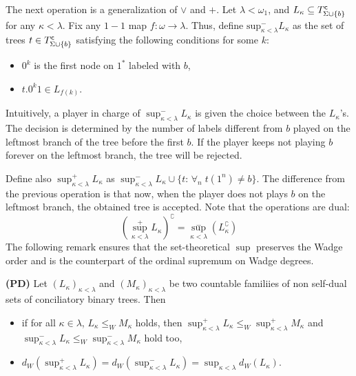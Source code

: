 \documentclass{llncs}
\begin{document}
The next operation is a generalization of $\lor$ and $+$. Let $\lambda < \omega_1$, and $L_\kappa \subseteq T^{\sf c}_{\Sigma \cup \{b\}}$
for any $\kappa<\lambda$. Fix any $1-1$ map $f: \omega \to \lambda$. Thus, define $\mathrm{sup}^-_{\kappa<\lambda} L_\kappa$ as the set of trees $t
\in  T^{\sf c}_{\Sigma \cup \{b\}}$ satisfying the following conditions for some $k$:
\begin{itemize}
\item $0^k$ is the first node on $1^*$ labeled with $b$,
\item $t.0^k1 \in L_{f(k)}$.
\end{itemize}
Intuitively, a player in charge of $\sup^-_{\kappa<\lambda} L_\kappa$ is given the choice
between the $L_\kappa$'s. The decision is determined by the number of labels different from $b$ played on
the leftmost branch of the tree before the first $b$. If the player keeps not
playing $b$  forever on the leftmost branch, the tree will be rejected.  

Define also
$\sup^+ _{\kappa<\lambda} L_\kappa$ as $\sup^-_{\kappa<\lambda} L_\kappa\cup \{t :\, \forall_n\; t(1^n)\neq b\}$.
The difference from the previous operation is that now, when the
player does not plays $b$ on the leftmost branch, the obtained tree is
accepted. Note that the operations are dual: 
\[\left ( \sup^+ _{\kappa<\lambda} L_\kappa \right )^\complement = \sup^-_{\kappa<\lambda} \left ( L_\kappa^\complement
\right )\]
The following remark ensures that the set-theoretical $\sup$ preserves the Wadge order and is the counterpart of the ordinal supremum on Wadge degrees.
\begin{remark}{\bf (PD)}
\label{r_sup}
Let $(L_\kappa)_{\kappa<\lambda}$ and $(M_\kappa)_{\kappa<\lambda}$ be two countable familiies of non self-dual sets of conciliatory binary trees. Then
\begin{itemize}
\item if for all $\kappa \in \lambda$, $L_\kappa \leq_W M_\kappa$ holds, 
then $\sup^+_{\kappa<\lambda} L_\kappa \leq_W \sup^+_{\kappa<\lambda} M_\kappa$ and $\sup^-_{\kappa<\lambda} L_\kappa \leq_W \sup^-_{\kappa<\lambda} M_\kappa$
 hold too,
\item$d_W(\sup^+ _{\kappa<\lambda} L_\kappa)= d_W(\sup^- _{\kappa<\lambda} L_\kappa)=\sup_{\kappa<\lambda}d_W( L_\kappa)$.
\end{itemize}
\end{remark}
\end{document}
